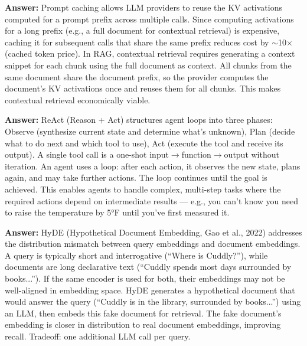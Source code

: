 \documentclass[11pt, a4paper]{article}
\begin{document}
\begin{notebox}
\textbf{Answer:} Prompt caching allows LLM providers to reuse the KV activations computed for a prompt prefix across multiple calls. Since computing activations for a long prefix (e.g., a full document for contextual retrieval) is expensive, caching it for subsequent calls that share the same prefix reduces cost by $\sim$10$\times$ (cached token price). In RAG, contextual retrieval requires generating a context snippet for each chunk using the full document as context. All chunks from the same document share the document prefix, so the provider computes the document's KV activations once and reuses them for all chunks. This makes contextual retrieval economically viable.
\end{notebox}

\begin{notebox}
\textbf{Answer:} ReAct (Reason + Act) structures agent loops into three phases: Observe (synthesize current state and determine what's unknown), Plan (decide what to do next and which tool to use), Act (execute the tool and receive its output). A single tool call is a one-shot input$\to$function$\to$output without iteration. An agent uses a loop: after each action, it observes the new state, plans again, and may take further actions. The loop continues until the goal is achieved. This enables agents to handle complex, multi-step tasks where the required actions depend on intermediate results --- e.g., you can't know you need to raise the temperature by 5°F until you've first measured it.
\end{notebox}

\begin{notebox}
\textbf{Answer:} HyDE (Hypothetical Document Embedding, Gao et al., 2022) addresses the distribution mismatch between query embeddings and document embeddings. A query is typically short and interrogative (``Where is Cuddly?''), while documents are long declarative text (``Cuddly spends most days surrounded by books...''). If the same encoder is used for both, their embeddings may not be well-aligned in embedding space. HyDE generates a hypothetical document that would answer the query (``Cuddly is in the library, surrounded by books...'') using an LLM, then embeds this fake document for retrieval. The fake document's embedding is closer in distribution to real document embeddings, improving recall. Tradeoff: one additional LLM call per query.
\end{notebox}
\end{document}
